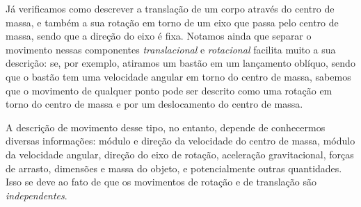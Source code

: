 
Já verificamos como descrever a translação de um corpo através do centro de massa, e também a sua  rotação em torno de um eixo que passa pelo centro de massa, sendo que a direção do eixo é fixa. Notamos ainda que separar o movimento nessas componentes \emph{translacional} e \emph{rotacional} facilita muito a sua descrição: se, por exemplo, atiramos um bastão em um lançamento oblíquo, sendo que o bastão tem uma velocidade angular em torno do centro de massa, sabemos que o movimento de qualquer ponto pode ser descrito como uma rotação em torno do centro de massa e por um deslocamento do centro de massa.

A descrição de movimento desse tipo, no entanto, depende de conhecermos diversas informações: módulo e direção da velocidade do centro de massa, módulo da velocidade angular, direção do eixo de rotação, aceleração gravitacional, forças de arrasto, dimensões e massa do objeto, e potencialmente outras quantidades. Isso se deve ao fato de que os movimentos de rotação e de translação são \emph{independentes}.

